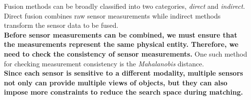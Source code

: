 \documentclass[]{article}
\begin{document}
			\noindent
			Fusion methods can be broadly classified into two categories, \textit{direct} and \textit{indirect}.  Direct fusion combines raw sensor measurements while indirect methods transform the sensor data to be fused. \\
			\noindent
			\textbf{Before sensor measurements can be combined, we must ensure that the measurements represent the same physical entity. Therefore, we need to check the consistency of sensor measurements.}  One such method for checking measurement consistency is the \textit{Mahalanobis} distance.\\
			\noindent
			\textbf{Since each sensor is sensitive to a different modality, multiple sensors not only can provide multiple views of objects, but they can also impose more constraints to reduce the search space during matching.}\\
			
\end{document}

